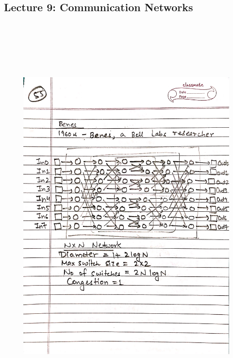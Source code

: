 \newpage
{\color{black} \subsection*{Lecture 9: Communication Networks}}
\begin{figure}[H]
    \centering
    \includegraphics[width=16cm, height=21cm]{"./MIT-6.042J/MIT-6042J-055"}
\end{figure}

